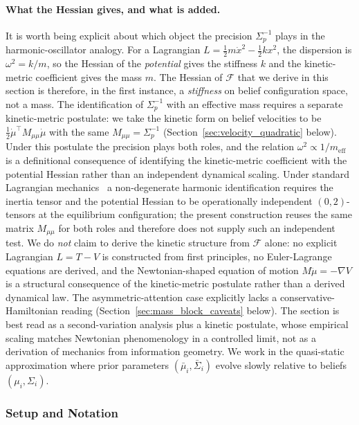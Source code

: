 \documentclass[11pt]{article}
\begin{document}
\paragraph{What the Hessian gives, and what is added.} It is worth being explicit about which object the precision $\Sigma_p^{-1}$ plays in the harmonic-oscillator analogy. For a Lagrangian $L = \tfrac12 m \dot{x}^2 - \tfrac12 k x^2$, the dispersion is $\omega^2 = k/m$, so the Hessian of the \emph{potential} gives the stiffness $k$ and the kinetic-metric coefficient gives the mass $m$. The Hessian of $\mathcal{F}$ that we derive in this section is therefore, in the first instance, a \emph{stiffness} on belief configuration space, not a mass. The identification of $\Sigma_p^{-1}$ with an effective mass requires a separate kinetic-metric postulate: we take the kinetic form on belief velocities to be $\tfrac12 \dot{\mu}^\top M_{\mu\mu} \dot{\mu}$ with the same $M_{\mu\mu} = \Sigma_p^{-1}$ (Section~\ref{sec:velocity_quadratic} below). Under this postulate the precision plays both roles, and the relation $\omega^2 \propto 1/m_{\text{eff}}$ is a definitional consequence of identifying the kinetic-metric coefficient with the potential Hessian rather than an independent dynamical scaling. Under standard Lagrangian mechanics~\cite{arnold1989mathematical} a non-degenerate harmonic identification requires the inertia tensor and the potential Hessian to be operationally independent $(0,2)$-tensors at the equilibrium configuration; the present construction reuses the same matrix $M_{\mu\mu}$ for both roles and therefore does not supply such an independent test. We do \emph{not} claim to derive the kinetic structure from $\mathcal{F}$ alone: no explicit Lagrangian $L = T - V$ is constructed from first principles, no Euler-Lagrange equations are derived, and the Newtonian-shaped equation of motion $M\ddot\mu = -\nabla V$ is a structural consequence of the kinetic-metric postulate rather than a derived dynamical law. The asymmetric-attention case explicitly lacks a conservative-Hamiltonian reading (Section~\ref{sec:mass_block_caveats} below). The section is best read as a second-variation analysis plus a kinetic postulate, whose empirical scaling matches Newtonian phenomenology in a controlled limit, not as a derivation of mechanics from information geometry. We work in the quasi-static approximation where prior parameters $(\bar{\mu}_i, \bar{\Sigma}_i)$ evolve slowly relative to beliefs $(\mu_i, \Sigma_i)$.

\subsubsection{Setup and Notation}
\end{document}
